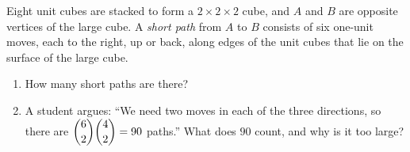 Eight unit cubes are stacked to form a $2\times2\times2$ cube, and $A$ and $B$ are opposite vertices of the large cube. A \emph{short path} from $A$ to $B$ consists of six one-unit moves, each to the right, up or back, along edges of the unit cubes that lie on the surface of the large cube.
\begin{enumerate}
\item[(a)] How many short paths are there?
\item[(b)] A student argues: ``We need two moves in each of the three directions, so there are $\dbinom62\dbinom42=90$ paths.'' What does $90$ count, and why is it too large?
\end{enumerate}
